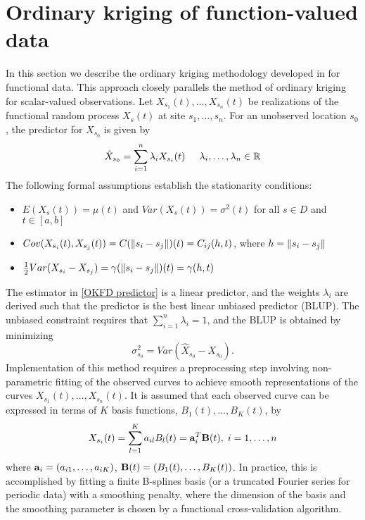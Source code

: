 \section{Ordinary kriging of function-valued data} %
\label{sec:ordinary_kriging_of_function_valued_data}
In this section we describe the ordinary kriging methodology developed in \cite{Giraldo:2010jx} for functional data. This approach closely parallels the method of ordinary kriging for scalar-valued observations. Let $X_{s_1}(t), \dots, X_{s_n}(t)$ be realizations of the functional random process $X_s(t)$ at site $s_1, \dots, s_n$. For an unobserved location $s_0$, the predictor for $X_{s_0}$ is given by 
\begin{equation}\label{OKFD predictor}
	\hat{X}_{s_0} = \sum_{i=1}^n\lambda_i X_{s_i}(t) \mbox{\hspace{0.5cm}} \lambda_i, \dots, \lambda_n \in \mathbb{R} 
\end{equation}
The following formal assumptions establish the stationarity conditions:
\begin{itemize}
	\item $E(X_s(t)) = \mu(t)$ and $Var(X_s(t)) = \sigma^2(t)$ for all $s \in D$ and $t \in [a,b]$
	\item $Cov(X_{s_i}(t), X_{s_j}(t)) = C(\left\|s_i - s_j\right\|)(t) = C_{ij}(h,t)$, where $h = \left\|s_i - s_j\right\|$
	\item $\frac{1}{2}Var(X_{s_i} - X_{s_j}) = \gamma(\left\|s_i - s_j\right\|)(t) = \gamma(h,t)$
\end{itemize}
The estimator in \eqref{OKFD predictor} is a linear predictor, and the weights $\lambda_i$ are derived such that the predictor is the best linear unbiased predictor (BLUP). The unbiased constraint requires that $\sum_{i=1}^n\lambda_i = 1$, and the BLUP is obtained by minimizing
\begin{equation}
	\sigma^2_{s_0} = Var(\widehat{X}_{s_0} - X_{s_0}).
\end{equation}
Implementation of this method requires a preprocessing step involving non-parametric fitting of the observed curves to achieve smooth representations of the curves $X_{s_1}(t), \dots, X_{s_n}(t)$. It is assumed that each observed curve can be expressed in terms of $K$ basis functions, $B_1(t), \dots, B_K(t)$, by 
\begin{equation}\label{eq:basis expansion}
	X_{s_i}(t) = \sum_{l=1}^K a_{il}B_l(t) = {\bf a}^T_i{\bf B}(t), \; i = 1, \dots, n
\end{equation}
where ${\bf a}_i = (a_{i1}, \dots, a_{iK})$, ${\bf B}(t) = (B_1(t), \dots, B_K(t))$. In practice, this is accomplished by fitting a finite B-splines basis (or a truncated Fourier series for periodic data) with a smoothing penalty, where the dimension of the basis and the smoothing parameter is chosen by a functional cross-validation algorithm. 


